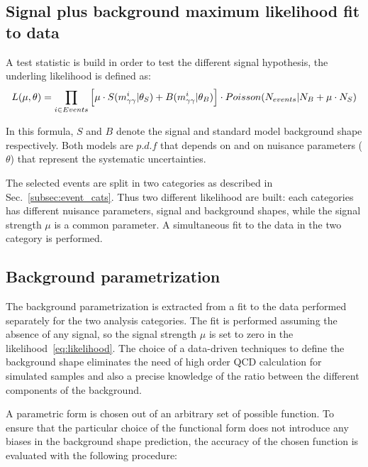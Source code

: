 \subsection{Signal plus background maximum likelihood fit to data}
A test statistic is build in order to test the different signal hypothesis, the underling likelihood
is defined as:
\begin{equation}
  \label{eq:likelihood}
  L(\mu, \theta) = \prod_{i\in Events}\Big[\mu\cdot S(m_{\gamma\gamma}^{i}|\theta_S) + B(m_{\gamma\gamma}^{i}|\theta_B)\Big]
  \cdot Poisson(N_{events}|N_B+\mu\cdot N_S)
\end{equation}

In this formula, $S$ and $B$ denote the signal and standard model background shape respectively. Both
models are $p.d.f$ that depends on \mgg and on nuisance parameters ($\theta$) that represent the systematic uncertainties.

The selected events are split in two categories as described in Sec.~\ref{subsec:event_cats}.
Thus two different likelihood are built: each categories has different nuisance parameters, signal and background shapes,
while the signal strength $\mu $ is a common parameter.
A simultaneous fit to the data in the two category is performed.

\clearpage

\subsection{Background parametrization}
\label{sec:background}
The background parametrization is extracted from a fit to the data performed separately for the two analysis
categories. The fit is performed assuming the absence of any signal, so the signal strength $\mu$ is set
to zero in the likelihood~\ref{eq:likelihood}.
The choice of a data-driven techniques to define the background shape eliminates the need of high order
QCD calculation for simulated samples and also a precise knowledge of the ratio between the different
components of the background.

A parametric form is chosen out of an arbitrary set of possible function.
To ensure that the particular choice of the functional form does not introduce any biases in the
background shape prediction, the accuracy of the chosen function is evaluated with the following
procedure:

